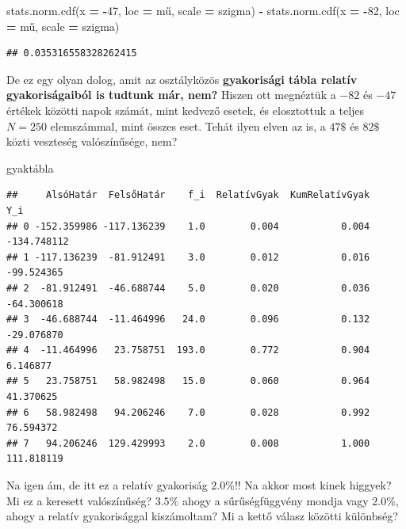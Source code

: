 \documentclass[
]{book}
\newenvironment{Shaded}{\begin{snugshade}}{\end{snugshade}}
\newcommand{\DecValTok}[1]{\textcolor[rgb]{0.00,0.00,0.81}{#1}}
\newcommand{\NormalTok}[1]{#1}
\newcommand{\OperatorTok}[1]{\textcolor[rgb]{0.81,0.36,0.00}{\textbf{#1}}}
\begin{document}
\begin{Shaded}
\begin{Highlighting}[]
\NormalTok{stats.norm.cdf(x }\OperatorTok{=} \OperatorTok{{-}}\DecValTok{47}\NormalTok{, loc }\OperatorTok{=}\NormalTok{ mű, scale }\OperatorTok{=}\NormalTok{ szigma) }\OperatorTok{{-}}\NormalTok{ stats.norm.cdf(x }\OperatorTok{=} \OperatorTok{{-}}\DecValTok{82}\NormalTok{, loc }\OperatorTok{=}\NormalTok{ mű, scale }\OperatorTok{=}\NormalTok{ szigma)}
\end{Highlighting}
\end{Shaded}

\begin{verbatim}
## 0.035316558328262415
\end{verbatim}

De ez egy olyan dolog, amit az osztályközös \textbf{gyakorisági tábla relatív gyakoriságaiból is tudtunk már, nem?} Hiszen ott megnéztük a \(-82\) és \(-47\) értékek közötti napok számát, mint kedvező esetek, és elosztottuk a teljes \(N=250\) elemszámmal, mint összes eset. Tehát ilyen elven az is, a \(47\$\) és \(82\$\) közti veszteség valószínűsége, nem?

\begin{Shaded}
\begin{Highlighting}[]
\NormalTok{gyaktábla}
\end{Highlighting}
\end{Shaded}

\begin{verbatim}
##     AlsóHatár  FelsőHatár    f_i  RelatívGyak  KumRelatívGyak         Y_i
## 0 -152.359986 -117.136239    1.0        0.004           0.004 -134.748112
## 1 -117.136239  -81.912491    3.0        0.012           0.016  -99.524365
## 2  -81.912491  -46.688744    5.0        0.020           0.036  -64.300618
## 3  -46.688744  -11.464996   24.0        0.096           0.132  -29.076870
## 4  -11.464996   23.758751  193.0        0.772           0.904    6.146877
## 5   23.758751   58.982498   15.0        0.060           0.964   41.370625
## 6   58.982498   94.206246    7.0        0.028           0.992   76.594372
## 7   94.206246  129.429993    2.0        0.008           1.000  111.818119
\end{verbatim}

Na igen ám, de itt ez a relatív gyakoriság \(2.0\%\)!! Na akkor most kinek higgyek? Mi ez a keresett valószínűség? \(3.5\%\) ahogy a sűrűségfüggvény mondja vagy \(2.0\%\), ahogy a relatív gyakorisággal kiszámoltam? Mi a kettő válasz közötti különbség?
\end{document}
